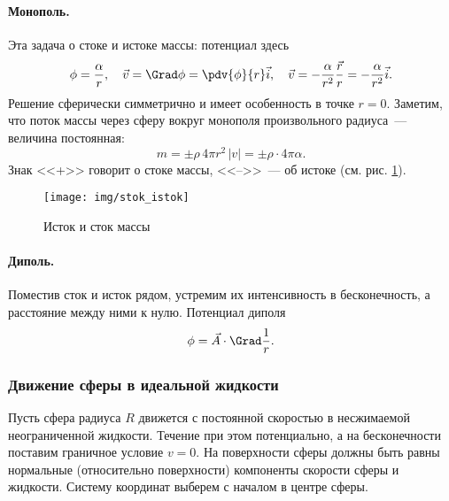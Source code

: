 \paragraph{Монополь.} Эта задача о стоке и истоке массы: потенциал здесь
\begin{equation}
    \phi = \frac{\alpha}{r}, \quad \vec{v} = \Grad \phi = \pdv{\phi}{r} \vec{i}, \quad \vec{v} = -\frac{\alpha}{r^2}  \frac{\vec{r}}{r} =
    -\frac{\alpha}{r^2} \vec{i}.
\end{equation}
Решение сферически симметрично и имеет особенность в точке $r=0$. Заметим, что поток массы через сферу вокруг монополя произвольного радиуса~--- величина постоянная:
\begin{equation}
    m = \pm\rho\, 4\pi r^2\, |v| = \pm\rho\cdot 4\pi\alpha.
\end{equation}
Знак <<+>> говорит о стоке массы, <<-->>~--- об истоке (см. рис. \ref{fig:stokistok}).
\begin{figure}[H]
    \centering
    \texttt{[image: img/stok\_istok]}
    \caption{Исток и сток массы}
    \label{fig:stokistok}
\end{figure}

\paragraph{Диполь.} Поместив сток и исток рядом, устремим их интенсивность в бесконечность, а расстояние между ними к нулю. Потенциал диполя
\begin{equation}
    \phi = \vec{A} \cdot \Grad \frac{1}{r}.
\end{equation}

\subsubsection{Движение сферы в идеальной жидкости}
Пусть сфера радиуса $R$ движется с постоянной скоростью в несжимаемой
неограниченной жидкости. Течение при этом потенциально, а на бесконечности поставим граничное условие $v=0$. На поверхности сферы должны быть равны нормальные (относительно поверхности) компоненты скорости сферы и жидкости. Систему координат выберем с началом в центре сферы.


